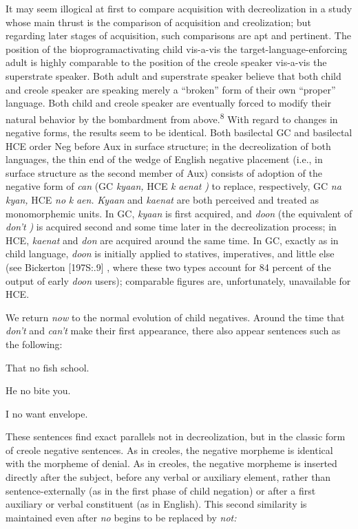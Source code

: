 It may seem illogical at first to compare acquisition with de\-creolization in a study whose main thrust is the comparison of acquisi\-tion and creolization; but regarding later stages of acquisition, such comparisons are apt and pertinent. The position of the bioprogram\-activating child vis-a-vis the target-language-enforcing adult is highly comparable to the position of the creole speaker vis-a-vis the super\-strate speaker. Both adult and superstrate speaker believe that both child and creole speaker are speaking merely a ``broken'' form of their own ``proper'' language. Both child and creole speaker are eventually forced to modify their natural behavior by the bombardment from above.\textsuperscript{8} With regard to changes in negative forms, the results seem to be identical. Both basilectal GC and basilectal HCE order Neg
before Aux in surface structure; in the decreolization of both languages, the thin end of the wedge of English negative placement (i.e., in surface structure as the second member of Aux) consists of adoption of the negative form of \textit{can} (GC \textit{kyaan,} HCE \textit{k} \textit{aenat} \textit{)} to replace, respectively, GC \textit{na} \textit{kyan,} HCE \textit{no} \textit{k} \textit{aen.} \textit{Kyaan} and \textit{kaenat} are both perceived and treated as monomorphemic units. In GC, \textit{kyaan} is first acquired, and \textit{doon} (the equivalent of \textit{don't} \textit{)} is acquired second and some time later in the decreolization process; in HCE, \textit{kaenat} and \textit{don} are acquired around the same time. In GC, exactly as in child language, \textit{doon} is initially applied to statives, imperatives, and little else (see Bickerton [197S:.9] , where these two types account for 84 percent of the output of early \textit{doon} users); comparable figures are, unfortunately, unavailable for HCE.

We return \textit{now} to the normal evolution of child negatives. Around the time that \textit{don't} and \textit{can't} make their first appearance, there also appear sentences such as the following:

\ea\label{ex:58}
 That no fish school. 
\z

\ea\label{ex:59}
 He no bite you. 
\z

\ea\label{ex:60}
 I no want envelope. 
\z

These sentences find exact parallels not in decreolization, but in the classic form of creole negative sentences. As in creoles, the negative morpheme is identical with the morpheme of denial. As in creoles, the negative morpheme is inserted directly after the subject, before any verbal or auxiliary element, rather than sentence-externally (as in the first phase of child negation) or after a first auxiliary or verbal constituent (as in English). This second similarity is maintained even after \textit{no} begins to be replaced by \textit{not:}

